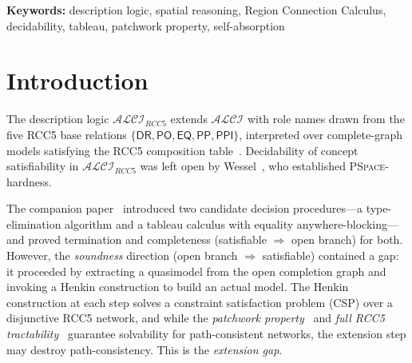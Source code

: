 \documentclass[a4paper,11pt]{article}
\theoremstyle{definition}
\newcommand{\ALCI}{\ensuremath{\mathcal{ALCI}}}
\newcommand{\ALCIRCC}[1]{\ensuremath{\mathcal{ALCI}_{\mathit{RCC#1}}}}
\newcommand{\DR}{\ensuremath{\mathsf{DR}}}
\newcommand{\PO}{\ensuremath{\mathsf{PO}}}
\newcommand{\EQ}{\ensuremath{\mathsf{EQ}}}
\newcommand{\PP}{\ensuremath{\mathsf{PP}}}
\newcommand{\PPI}{\ensuremath{\mathsf{PPI}}}
\newcommand{\comp}{\ensuremath{\mathsf{comp}}}
\newcommand{\DN}{\ensuremath{\mathsf{DN}}}
\newcommand{\PSPACE}{\textsc{PSpace}}
\begin{document}
\bigskip

\begin{abstract}
The companion paper~\cite{CompanionPaper} presented two decision
procedures for concept satisfiability in $\ALCIRCC{5}$---a
type-elimination algorithm and a tableau calculus with blocking---but
identified an \emph{extension gap}: the soundness direction of the
tableau (open branch $\Rightarrow$ model) relied on a Henkin
construction whose correctness for abstract quasimodels was unproven.
We attempted to close this gap by identifying the algebraic root
cause---the self-absorption failure
$\PPI \notin \comp(\DR, \PPI) = \{\DR\}$---and constructing a model
directly from open completion graphs via the \emph{full RCC5
tractability} theorem.
\textbf{Erratum:} This paper is \textbf{retracted}.  The algebraic
analysis contains an error ($\comp(\DR, \PP) \neq \{\DR\}$), and the
path-consistency theorem (Theorem~\ref{thm:path-consistent}) is
\textbf{false}: the $\DN_{\mathsf{safe}}$ domains are too coarse.
See the status box for details.
\end{abstract}

\medskip
\noindent\textbf{Keywords:} description logic, spatial reasoning,
Region Connection Calculus, decidability, tableau, patchwork property,
self-absorption

\section{Introduction}
\label{sec:intro}

The description logic $\ALCIRCC{5}$ extends $\ALCI$ with role names
drawn from the five RCC5 base relations $\{\DR, \PO, \EQ, \PP, \PPI\}$,
interpreted over complete-graph models satisfying the RCC5 composition
table~\cite{Wessel2003,Wessel2000}.  Decidability of concept
satisfiability in $\ALCIRCC{5}$ was left open by
Wessel~\cite{Wessel2003}, who established \PSPACE-hardness.

The companion paper~\cite{CompanionPaper} introduced two candidate
decision procedures---a type-elimination algorithm and a tableau
calculus with equality anywhere-blocking---and proved termination and
completeness (satisfiable $\Rightarrow$ open branch) for both.
However, the \emph{soundness} direction (open branch $\Rightarrow$
satisfiable) contained a gap: it proceeded by extracting a quasimodel
from the open completion graph and invoking a Henkin construction to
build an actual model.  The Henkin construction at each step solves a
constraint satisfaction problem (CSP) over a disjunctive RCC5 network,
and while the \emph{patchwork property}~\cite{RenzNebel1999} and
\emph{full RCC5 tractability}~\cite{Renz1999} guarantee solvability
for path-consistent networks, the extension step may destroy
path-consistency.  This is the \emph{extension gap}.
\end{document}
